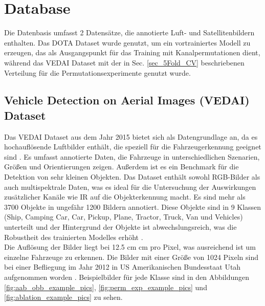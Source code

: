 \section{Database}
Die Datenbasis umfasst 2 Datensätze, die annotierte Luft- und Satellitenbildern enthalten. Das \acrshort{DOTA} Dataset wurde genutzt, um ein vortrainiertes Modell zu erzeugen, das als Ausgangspunkt für das Training mit Kanalpermutationen dient, während das \acrshort{VEDAI} Dataset mit der in Sec. \ref{sec_5Fold_CV} beschriebenen Verteilung für die Permutationsexperimente genutzt wurde.
\subsection{Vehicle Detection on Aerial Images (VEDAI) Dataset}
\label{subsec:VEDAI}

Das \Acrshort{VEDAI} Dataset \cite{vedai_web}  aus dem Jahr 2015 bietet sich als Datengrundlage an, da es hochauflösende Luftbilder enthält, die speziell für die Fahrzeugerkennung geeignet sind \cite{Razakarivony2015}. Es umfasst annotierte Daten, die Fahrzeuge in unterschiedlichen Szenarien, Größen und Orientierungen zeigen. Außerdem ist es ein Benchmark für die Detektion von sehr kleinen Objekten. Das Dataset enthält sowohl \acrshort{RGB}-Bilder als auch multispektrale Daten, was es ideal für die Untersuchung der Auswirkungen zusätzlicher Kanäle wie \acrshort{IR} auf die Objekterkennung macht. Es sind mehr als 3700 Objekte in ungefähr 1200 Bildern annotiert. Diese Objekte sind in 9 Klassen (Ship, Camping Car, Car, Pickup, Plane, Tractor, Truck, Van und Vehicles) unterteilt und der Hintergrund der Objekte ist abwechslungsreich, was die Robustheit des trainierten Modelles erhöht \cite{Razakarivony2015}. \\
Die Auflösung der Bilder liegt bei 12.5 cm  cm pro Pixel, was ausreichend ist um einzelne Fahrzeuge zu erkennen. Die Bilder mit einer Größe von 1024  Pixeln sind bei einer Befliegung im Jahr 2012 in US Amerikanischen Bundesstaat Utah aufgenommen worden \cite{Razakarivony2015}. Beispielbilder für jede Klasse sind in den Abbildungen \ref{fig:aab_obb_example_pics}, \ref{fig:perm_exp_example_pics} und \ref{fig:ablation_example_pics} zu sehen.



